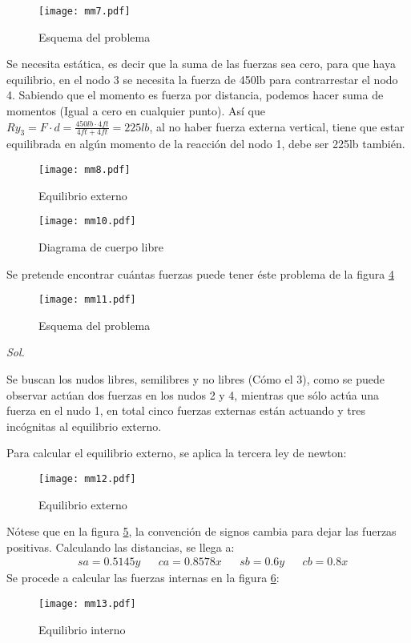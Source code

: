 \begin{figure}[h!]
\centering
  \texttt{[image: mm7.pdf]}
  \caption{Esquema del problema}
  \label{mm7}
\end{figure}

Se necesita estática, es decir que la suma de las fuerzas sea cero, para que haya equilibrio, en el nodo 3 se necesita la fuerza de 450lb para contrarrestar el nodo 4. Sabiendo que el momento es fuerza por distancia, podemos hacer suma de momentos (Igual a cero en cualquier punto).
Así que $Ry_3=F\cdot d=\frac{450lb\cdot 4ft}{4ft+4ft}=225lb$, al no haber fuerza externa vertical, tiene que estar equilibrada en algún momento de la reacción del nodo 1, debe ser 225lb también.

\begin{figure}[h!]
\centering
  \texttt{[image: mm8.pdf]}
  \caption{Equilibrio externo}
  \label{mm8}
\end{figure}

\begin{figure}[h!]
\centering
  \texttt{[image: mm10.pdf]}
  \caption{Diagrama de cuerpo libre}
  \label{mm10}
\end{figure}
\begin{example}
  Se pretende encontrar cuántas fuerzas puede tener éste problema de la figura \ref{mm11}
\end{example}

\begin{figure}[h!]
\centering
\texttt{[image: mm11.pdf]}
\caption{Esquema del problema}
\label{mm11}
\end{figure}
\textit{ Sol. }

Se buscan los nudos libres, semilibres y no libres (Cómo el 3), como se puede observar actúan dos fuerzas en los nudos 2 y 4, mientras que sólo actúa una fuerza en el nudo 1,
en total cinco fuerzas externas están actuando y tres incógnitas al equilibrio externo.

Para calcular el equilibrio externo, se aplica la tercera ley de newton:

\begin{figure}[h!]
\centering
\texttt{[image: mm12.pdf]}
\caption{Equilibrio externo}
\label{mm12}
\end{figure}

Nótese que en la figura \ref{mm12}, la convención de signos cambia para dejar las fuerzas positivas. Calculando las distancias, se llega a:
\begin{align*}
  &sa = 0.5145y&&ca=0.8578x&&sb =0.6y&&cb= 0.8x
\end{align*}
Se procede a calcular las fuerzas internas en la figura \ref{mm13}:
\begin{figure}[h!]
\centering
\texttt{[image: mm13.pdf]}
\caption{Equilibrio interno}
\label{mm13}
\end{figure}

